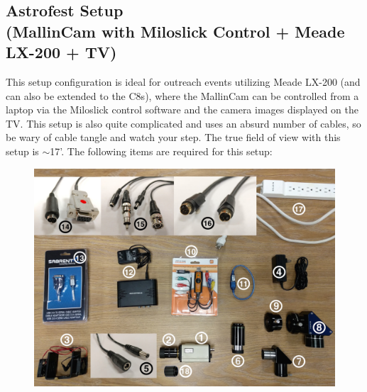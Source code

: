 \documentclass[12pt,titlepage]{article}
\begin{document}
\subsection{Astrofest Setup\\
\small(MallinCam with Miloslick Control + Meade LX-200 + TV)} \label{ssec:Astrofest_Setup}
This setup configuration is ideal for outreach events utilizing Meade LX-200 (and can also be extended to the C8s), where the MallinCam can be controlled from a laptop via the Miloslick control software and the camera images displayed on the TV.
This setup is also quite complicated and uses an absurd number of cables, so be wary of cable tangle and watch your step.
The true field of view with this setup is $\sim$17'.
The following items are required for this setup:

\begin{figure}[H] 
	\begin{center}
		\includegraphics[width=.95\textwidth]{./images/MallinCam/astrofest_setup/equipment_numbered.jpg} 
	\end{center}
\end{figure}
\end{document}
